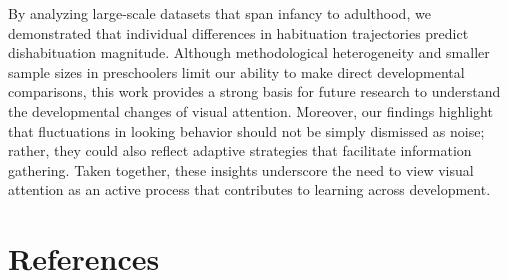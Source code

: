 \documentclass[10pt, letterpaper]{article}
\begin{document}
By analyzing large-scale datasets that span infancy to adulthood, we
demonstrated that individual differences in habituation trajectories
predict dishabituation magnitude. Although methodological heterogeneity
and smaller sample sizes in preschoolers limit our ability to make
direct developmental comparisons, this work provides a strong basis for
future research to understand the developmental changes of visual
attention. Moreover, our findings highlight that fluctuations in looking
behavior should not be simply dismissed as noise; rather, they could
also reflect adaptive strategies that facilitate information gathering.
Taken together, these insights underscore the need to view visual
attention as an active process that contributes to learning across
development.

\hypertarget{references}{%
\section{References}\label{references}}

\setlength{\parindent}{-0.1in} 
\setlength{\leftskip}{0.125in}

\noindent
\end{document}
